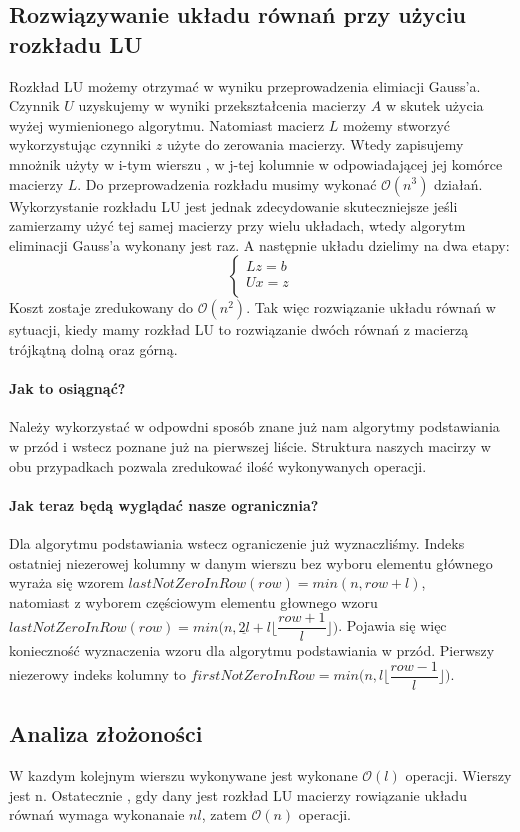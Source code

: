 \documentclass[11pt]{article}
\begin{document}
\begin{flushleft}
\subsection{Rozwiązywanie układu równań przy użyciu rozkładu LU}
Rozkład LU możemy otrzymać w wyniku przeprowadzenia elimiacji Gauss'a. Czynnik $U$ uzyskujemy w wyniki przekształcenia macierzy $A$ w skutek użycia wyżej wymienionego algorytmu. Natomiast macierz $L$ możemy stworzyć wykorzystując czynniki $z$ użyte do zerowania macierzy. Wtedy zapisujemy mnożnik użyty w i-tym wierszu , w j-tej kolumnie w odpowiadającej jej komórce macierzy $L$. Do przeprowadzenia rozkładu musimy wykonać $\mathcal{O}(n^3)$ działań. Wykorzystanie rozkładu LU jest jednak zdecydowanie skuteczniejsze jeśli zamierzamy użyć tej samej macierzy przy wielu układach, wtedy algorytm eliminacji Gauss'a wykonany jest raz. A następnie układu dzielimy na dwa etapy:
$$
\left\{ 
\begin{array}{ll}
Lz = b\\
Ux = z\\
\end{array} \right.
$$
Koszt zostaje zredukowany do $\mathcal{O}(n^2)$. Tak więc rozwiązanie układu równań w sytuacji, kiedy mamy rozkład LU to rozwiązanie dwóch równań z macierzą trójkątną dolną oraz górną.\paragraph{Jak to osiągnąć?} Należy wykorzystać w odpowdni sposób znane już nam algorytmy podstawiania w przód i wstecz poznane już na pierwszej liście. Struktura naszych macirzy w obu przypadkach pozwala zredukować ilość wykonywanych operacji. \paragraph{Jak teraz będą wyglądać nasze ogranicznia?} Dla algorytmu podstawiania wstecz ograniczenie już wyznaczliśmy. Indeks ostatniej niezerowej kolumny w danym wierszu bez wyboru elementu głównego wyraża się wzorem $lastNotZeroInRow(row) = min(n, row+l)$, \\natomiast z wyborem częściowym elementu głownego wzoru $lastNotZeroInRow(row) = min \Big( n, \underline{2l}+l \Big \lfloor \dfrac{row+1}{l} \Big \rfloor \Big) $.  Pojawia się więc konieczność wyznaczenia wzoru dla algorytmu podstawiania w przód. Pierwszy niezerowy indeks kolumny to $firstNotZeroInRow = min \Big( n, l \Big \lfloor \dfrac{row-1}{l} \Big \rfloor \Big)$.
\subsection{Analiza złożoności}
W kazdym kolejnym wierszu wykonywane jest wykonane $\mathcal{O}(l)$ operacji. Wierszy jest n. Ostatecznie , gdy dany jest rozkład LU  macierzy rowiązanie układu równań wymaga wykonanaie $nl$, zatem $\mathcal{O}(n)$ operacji. 
\newpage

\end{flushleft}
\end{document}
